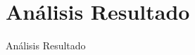 \hypertarget{analisis_resultado}{%
    \section{Análisis Resultado}\label{Análisis Resultado}}
    \vfill
    Análisis Resultado
    \vfill